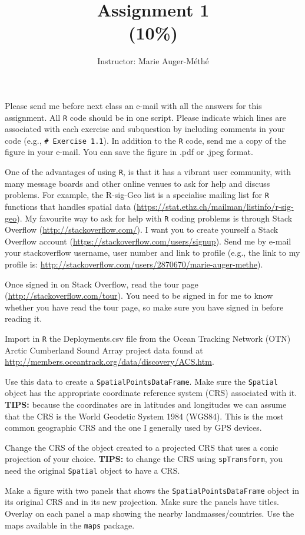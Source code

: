 \documentclass[11pt, oneside]{article}   	%
\title{Assignment 1 \\ \large(10\%)}
\author{Instructor: Marie Auger-M\'eth\'e}
\date{}							%
\begin{document}
\maketitle

Please send me before next class an e-mail with all the answers for this assignment. All \texttt{R} code should be in one script. Please indicate which lines are associated with each exercise and subquestion by including comments in your code (e.g., \texttt{\# Exercise 1.1}). In addition to the \texttt{R} code, send me a copy of the figure in your e-mail. You can save the figure in .pdf or .jpeg format. 

\begin{Exercise}
One of the advantages of using \texttt{R}, is that it has a vibrant user community, with many message boards and other online venues to ask for help and discuss problems. For example, the R-sig-Geo list is a specialise mailing list for \texttt{R} functions that handles spatial data (\url{https://stat.ethz.ch/mailman/listinfo/r-sig-geo}). 
\Question My favourite way to ask for help with \texttt{R} coding problems is through Stack Overflow (\url{http://stackoverflow.com/}). I want you to create yourself a Stack Overflow account (\url{https://stackoverflow.com/users/signup}). Send me by e-mail your stackoverflow username, user number and link to profile (e.g., the link to my profile is: \url{http://stackoverflow.com/users/2870670/marie-auger-methe}). 

\Question Once signed in on Stack Overflow, read the tour page (\url{http://stackoverflow.com/tour}). You need to be signed in for me to know whether you have read the tour page, so make sure you have signed in before reading it. 
\end{Exercise}

\begin{Exercise}
Import in \texttt{R} the Deployments.csv file from the Ocean Tracking Network (OTN) Arctic Cumberland Sound Array project data found at \url{http://members.oceantrack.org/data/discovery/ACS.htm}. 

\Question Use this data to create a \texttt{SpatialPointsDataFrame}. Make sure the \texttt{Spatial} object has the appropriate coordinate reference system (CRS) associated with it. \textbf{TIPS:} because the coordinates are in latitudes and longitudes we can assume that the CRS is the World Geodetic System 1984 (WGS84). This is the most common geographic CRS  and the one I generally used by GPS devices.

\Question Change the CRS of the object created to a projected CRS that uses a conic projection of your choice. \textbf{TIPS:} to change the CRS using \texttt{spTransform}, you need the original \texttt{Spatial} object to have a CRS.

\Question Make a figure with two panels that shows the \texttt{SpatialPointsDataFrame} object in its original CRS and in its new projection. Make sure the panels have titles. Overlay on each panel a map showing the nearby landmasses/countries. Use the maps available in the \texttt{maps} package.
\end{Exercise}
\end{document}
